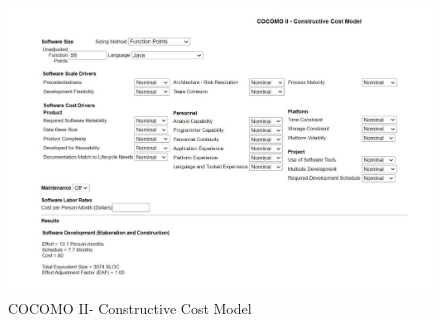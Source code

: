 \label{sec:cost-model}
\begin{figure}
	
	\includegraphics[width=1.4\linewidth]{images/cost-model.png}
	\caption{COCOMO II- Constructive Cost Model}
\end{figure} 
